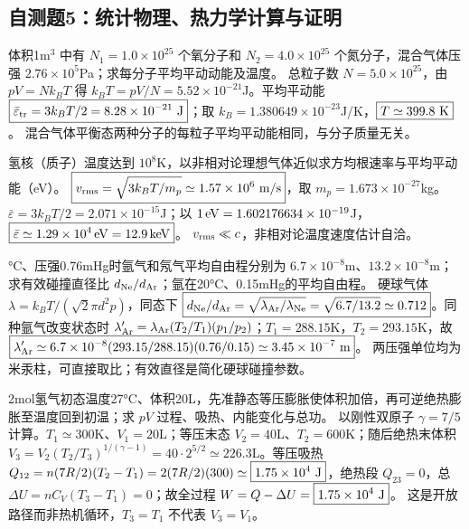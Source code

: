 \subsection{自测题5：统计物理、热力学计算与证明}

\problemtext 体积1m$^3$ 中有 $N_1=1.0\times10^{25}$ 个氧分子和 $N_2=4.0\times10^{25}$ 个氮分子，混合气体压强 $2.76\times10^5$Pa；求每分子平均平动动能及温度。
\workings 总粒子数 $N=5.0\times10^{25}$，由 $pV=Nk_BT$ 得 $k_BT=pV/N=5.52\times10^{-21}$J。平均平动能 $\boxed{\bar\varepsilon_{\rm tr}=3k_BT/2=8.28\times10^{-21}\ {\rm J}}$；取 $k_B=1.380649\times10^{-23}$J/K，$\boxed{T\simeq399.8\ {\rm K}}$。
\crosscheck 混合气体平衡态两种分子的每粒子平均平动能相同，与分子质量无关。

\problemtext 氢核（质子）温度达到 $10^8$K，以非相对论理想气体近似求方均根速率与平均平动能（eV）。
\workings $\boxed{v_{\rm rms}=\sqrt{3k_BT/m_p}\simeq1.57\times10^6\ {\rm m/s}}$，取 $m_p=1.673\times10^{-27}$kg。$\bar\varepsilon=3k_BT/2=2.071\times10^{-15}$J；以 $1\,{\rm eV}=1.602176634\times10^{-19}$J，$\boxed{\bar\varepsilon\simeq1.29\times10^4\,{\rm eV}=12.9\,{\rm keV}}$。
\crosscheck $v_{\rm rms}\ll c$，非相对论温度速度估计自洽。

°C、压强0.76mHg时氩气和氖气平均自由程分别为 $6.7\times10^{-8}$m、$13.2\times10^{-8}$m；求有效碰撞直径比 $d_{\rm Ne}/d_{\rm Ar}$；氩在20°C、0.15mHg的平均自由程。
\workings 硬球气体 $\lambda=k_BT/(\sqrt2\pi d^2p)$，同态下 $\boxed{d_{\rm Ne}/d_{\rm Ar}=\sqrt{\lambda_{\rm Ar}/\lambda_{\rm Ne}}=\sqrt{6.7/13.2}\simeq0.712}$。同种氩气改变状态时 $\lambda'_{{\rm Ar}}=\lambda_{\rm Ar}(T_2/T_1)(p_1/p_2)$；$T_1=288.15$K，$T_2=293.15$K，故 $\boxed{\lambda'_{{\rm Ar}}\simeq6.7\times10^{-8}(293.15/288.15)(0.76/0.15)\simeq3.45\times10^{-7}\ {\rm m}}$。
\crosscheck 两压强单位均为米汞柱，可直接取比；有效直径是简化硬球碰撞参数。

\problemtext 2mol氢气初态温度27°C、体积20L，先准静态等压膨胀使体积加倍，再可逆绝热膨胀至温度回到初温；求 $pV$ 过程、吸热、内能变化与总功。
\workings 以刚性双原子 $\gamma=7/5$ 计算。$T_1\simeq300$K、$V_1=20$L；等压末态 $V_2=40$L、$T_2=600$K；随后绝热末体积 $V_3=V_2(T_2/T_3)^{1/(\gamma-1)}=40\cdot2^{5/2}\simeq226.3$L。等压吸热 $Q_{12}=n(7R/2)(T_2-T_1)=2(7R/2)(300)\simeq\boxed{1.75\times10^4\ {\rm J}}$，绝热段 $Q_{23}=0$，总 $\Delta U=nC_V(T_3-T_1)=\boxed{0}$；故全过程 $W=Q-\Delta U=\boxed{1.75\times10^4\ {\rm J}}$。
\crosscheck 这是开放路径而非热机循环，$T_3=T_1$ 不代表 $V_3=V_1$。

